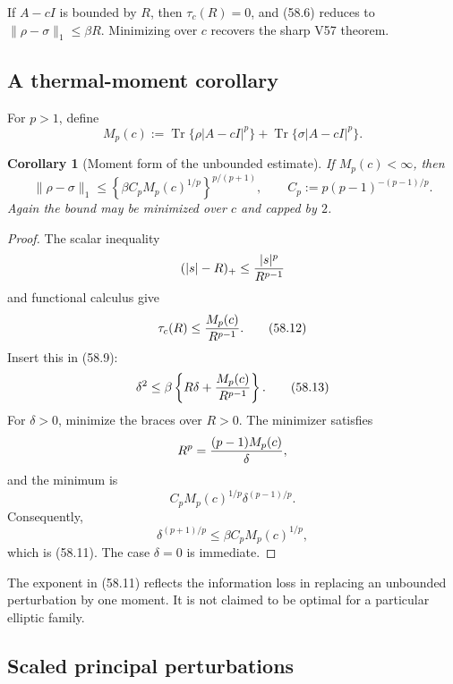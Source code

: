 \documentclass[11pt]{article}
\newtheorem{corollary}[theorem]{Corollary}
\theoremstyle{remark}
\begin{document}
If \(A-cI\) is bounded by \(R\), then \(\tau_c(R)=0\), and (58.6)
reduces to
\(\|\rho-\sigma\|_1\leq\beta R\).  Minimizing over \(c\) recovers
the sharp V57 theorem.

\subsection{A thermal-moment corollary}

For \(p>1\), define
\begin{equation}
 M_p(c)
 :=
 \operatorname{Tr}\{\rho|A-cI|^p\}
 +
 \operatorname{Tr}\{\sigma|A-cI|^p\}.             \tag{58.10}
\end{equation}

\begin{corollary}[Moment form of the unbounded estimate]
\label{cor:v12v58-moment}
If \(M_p(c)<\infty\), then
\begin{equation}
 \boxed{
 \|\rho-\sigma\|_1
 \leq
 \left\{
 \beta C_p M_p(c)^{1/p}
 \right\}^{p/(p+1)},\qquad
 C_p:=p(p-1)^{-(p-1)/p}.}                         \tag{58.11}
\end{equation}
Again the bound may be minimized over \(c\) and capped by \(2\).
\end{corollary}

\begin{proof}
The scalar inequality
\[
 (|s|-R)_+\leq {|s|^p\over R^{p-1}}
\]
and functional calculus give
\begin{equation}
                         \tau_c(R)
 \leq {M_p(c)\over R^{p-1}}.                      \tag{58.12}
\end{equation}
Insert this in (58.9):
\begin{equation}
 \delta^2
 \leq
 \beta\left\{R\delta+{M_p(c)\over R^{p-1}}\right\}.
                                                            \tag{58.13}
\end{equation}
For \(\delta>0\), minimize the braces over \(R>0\).  The minimizer
satisfies
\[
 R^p={(p-1)M_p(c)\over\delta},
\]
and the minimum is
\[
 C_p M_p(c)^{1/p}\delta^{(p-1)/p}.
\]
Consequently,
\[
 \delta^{(p+1)/p}
 \leq\beta C_p M_p(c)^{1/p},
\]
which is (58.11).  The case \(\delta=0\) is immediate.
\end{proof}

The exponent in (58.11) reflects the information loss in replacing
an unbounded perturbation by one moment.  It is not claimed to be
optimal for a particular elliptic family.

\subsection{Scaled principal perturbations}
\end{document}
